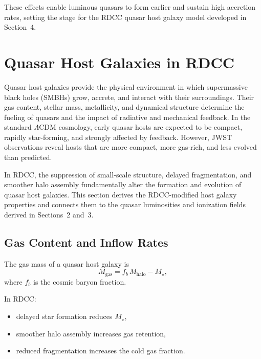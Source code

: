 \documentclass[11pt,a4paper]{article}
\begin{document}
These effects enable luminous quasars to form earlier and sustain high accretion rates,
setting the stage for the RDCC quasar host galaxy model developed in Section~4.

\section{Quasar Host Galaxies in RDCC}

Quasar host galaxies provide the physical environment in which supermassive black holes
(SMBHs) grow, accrete, and interact with their surroundings. Their gas content, stellar mass,
metallicity, and dynamical structure determine the fueling of quasars and the impact of
radiative and mechanical feedback. In the standard $\Lambda$CDM cosmology, early quasar
hosts are expected to be compact, rapidly star-forming, and strongly affected by feedback.
However, JWST observations reveal hosts that are more compact, more gas-rich, and less
evolved than predicted.

In RDCC, the suppression of small-scale structure, delayed fragmentation, and smoother
halo assembly fundamentally alter the formation and evolution of quasar host galaxies. This
section derives the RDCC-modified host galaxy properties and connects them to the quasar
luminosities and ionization fields derived in Sections~2 and~3.

\subsection{Gas Content and Inflow Rates}

The gas mass of a quasar host galaxy is
\begin{equation}
M_{\mathrm{gas}}
=
f_{b}\,M_{\mathrm{halo}}
-
M_{\star},
\end{equation}
where $f_{b}$ is the cosmic baryon fraction.

In RDCC:
\begin{itemize}
\item delayed star formation reduces $M_{\star}$,
\item smoother halo assembly increases gas retention,
\item reduced fragmentation increases the cold gas fraction.
\end{itemize}
\end{document}
